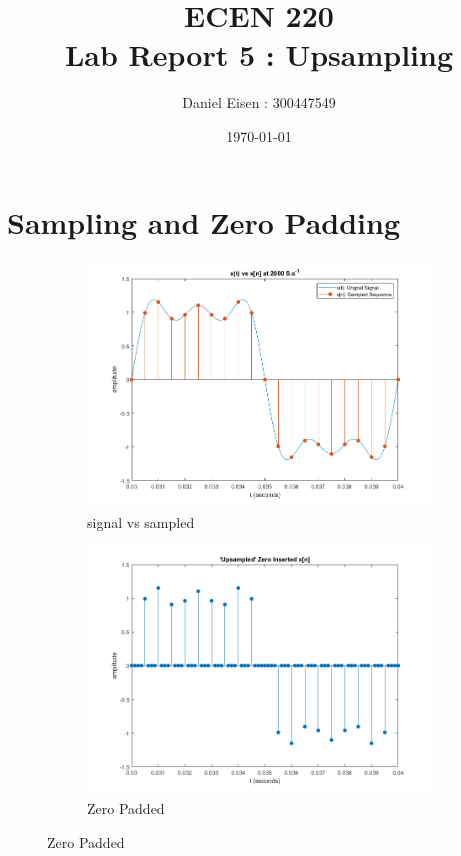 \documentclass[11pt]{article}
\title{ECEN 220 \\ Lab Report 5 : Upsampling}
\author{Daniel Eisen : 300447549}
\date{\today}
\begin{document}
	\maketitle

\section{Sampling and Zero Padding}
\begin{figure}[h]
	\centering
	\begin{subfigure}[b]{.4\linewidth}
	\includegraphics[width=\linewidth]{fig1}
	\caption{signal vs sampled}
	\end{subfigure}
	\begin{subfigure}[b]{.4\linewidth}
	\includegraphics[width=\linewidth]{fig2}
	\caption{Zero Padded}
	\end{subfigure}
\end{figure}
\end{document}

